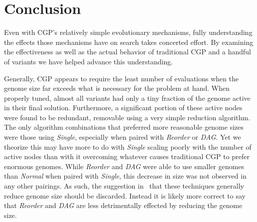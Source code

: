 \documentclass[journal]{IEEEtran}
\begin{document}
%





\section{Conclusion}
\label{sec:conclusion}
Even with CGP's relatively simple evolutionary mechanisms, fully understanding
the effects those mechanisms have on search takes concerted effort.  By examining
the effectiveness as well as the actual behavior of traditional CGP and
a handful of variants we have helped advance this understanding.

Generally, CGP appears to require the least number of evaluations when the genome
size far exceeds what is necessary for the problem at hand.  When properly tuned,
almost all variants had only a tiny fraction of the genome active in their final
solution.  Furthermore, a significant portion of these active nodes were found
to be redundant, removable using a very simple reduction algorithm.  The only
algorithm combinations that preferred more reasonable genome sizes were those using \emph{Single},
especially when paired with \emph{Reorder} or \emph{DAG}.  Yet we theorize this may
have more to do with \emph{Single} scaling poorly with the number of active nodes
than with it overcoming whatever causes traditional CGP to prefer enormous genomes.
While \emph{Reorder} and \emph{DAG} were able to use smaller genomes than \emph{Normal}
when paired with \emph{Single}, this decrease in size was not observed in any other
pairings.  As such, the suggestion in~\cite{goldman:2013:ordering} that these
techniques generally reduce genome size should be discarded.  Instead it is likely
more correct to say that \emph{Reorder} and \emph{DAG} are less detrimentally effected
by reducing the genome size.
\end{document}
